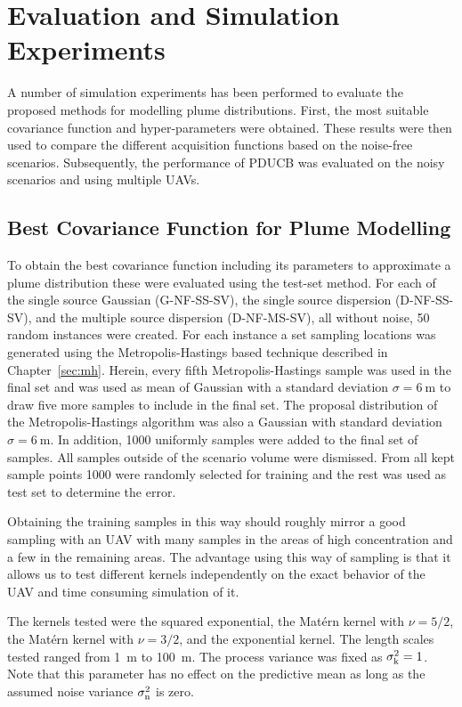 \chapter{Evaluation and Simulation Experiments}\label{sec:exp}
A number of simulation experiments has been performed to evaluate the proposed 
methods for modelling plume distributions. First, the most suitable covariance 
function and hyper-parameters were obtained. These results were then used to 
compare the different acquisition functions based on the noise-free scenarios.  
Subsequently, the performance of PDUCB was evaluated on the noisy scenarios and 
using multiple UAVs.

\section{Best Covariance Function for Plume Modelling}\label{sec:bestkernel}
To obtain the best covariance function including its parameters to approximate 
a plume distribution these were evaluated using the test-set method. For each of 
the single source Gaussian (G-NF-SS-SV), the single source dispersion 
(D-NF-SS-SV), and the multiple source dispersion (D-NF-MS-SV), all without 
noise, 50 random instances were created. For each instance a set sampling 
locations was generated using the Metropolis-Hastings based technique described 
in Chapter~\ref{sec:mh}. Herein, every fifth Metropolis-Hastings sample was used 
in the final set and was used as mean of Gaussian with a standard deviation 
$\sigma = \SI{6}{\meter}$ to draw five more samples to include in the final set.  
The proposal distribution of the Metropolis-Hastings algorithm was also 
a Gaussian with standard deviation $\sigma = \SI{6}{\meter}$. In addition, 1000 
uniformly samples were added to the final set of samples. All samples outside of 
the scenario volume were dismissed. From all kept sample points 1000 were 
randomly selected for training and the rest was used as test set to determine 
the error.

Obtaining the training samples in this way should roughly mirror a good sampling 
with an UAV with many samples in the areas of high concentration and a few in 
the remaining areas. The advantage using this way of sampling is that it allows 
us to test different kernels independently on the exact behavior of the UAV and 
time consuming simulation of it.

The kernels tested were the squared exponential, the Mat\'ern kernel with $\nu 
= 5/2$, the Mat\'ern kernel with $\nu = 3/2$, and the exponential kernel. The 
length scales tested ranged from \SI{1}{\meter} to \SI{100}{\meter}. The process 
variance was fixed as $\sigma_{\mathrm{k}}^2 = 1$. Note that this parameter has no 
effect on the predictive mean as long as the assumed noise variance 
$\sigma_{\mathrm{n}}^2$ is zero.

